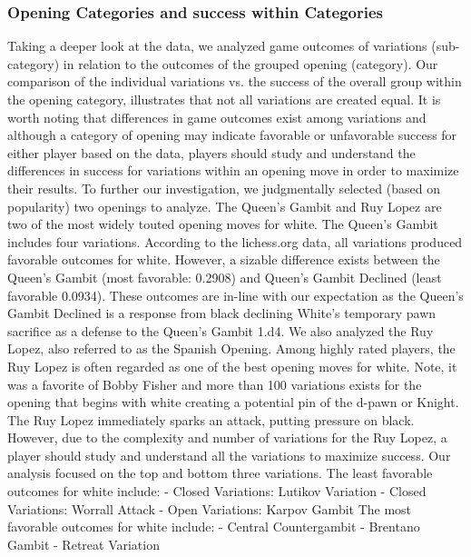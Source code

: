 \documentclass[reprint,
 amsmath,amssymb,nobibnotes,
 aps, floatfix]{revtex4-1}
\begin{document}
\subsubsection{Opening Categories and success within Categories }
Taking a deeper look at the data, we analyzed game outcomes of variations (sub-category) in relation to the outcomes of the grouped opening (category).  Our comparison of the individual variations vs. the success of the overall group within the opening category, illustrates that not all variations are created equal.  It is worth noting that differences in game outcomes exist among variations and although a category of opening may indicate favorable or unfavorable success for either player based on the data, players should study and understand the differences in success for variations within an opening move in order to maximize their results.
To further our investigation, we judgmentally selected (based on popularity) two openings to analyze. The Queen’s Gambit and Ruy Lopez are two of the most widely touted opening moves for white.
The Queen’s Gambit includes four variations.  According to the lichess.org data, all variations produced favorable outcomes for white.  However, a sizable difference exists between the Queen’s Gambit (most favorable: 0.2908) and Queen’s Gambit Declined (least favorable 0.0934).  These outcomes are in-line with our expectation as the Queen’s Gambit Declined is a response from black declining White's temporary pawn sacrifice as a defense to the Queen’s Gambit 1.d4.
We also analyzed the Ruy Lopez, also referred to as the Spanish Opening.  Among highly rated players, the Ruy Lopez is often regarded as one of the best opening moves for white. Note, it was a favorite of Bobby Fisher and more than 100 variations exists for the opening that begins with white creating a potential pin of the d-pawn or Knight. The Ruy Lopez immediately sparks an attack, putting pressure on black.   However, due to the complexity and number of variations for the Ruy Lopez, a player should study and understand all the variations to maximize success. Our analysis focused on the top and bottom three variations.
The least favorable outcomes for white include:
-    Closed Variations: Lutikov Variation
-    Closed Variations: Worrall Attack
-    Open Variations: Karpov Gambit
The most favorable outcomes for white include:
-    Central Countergambit
-    Brentano Gambit
-    Retreat Variation
\end{document}
